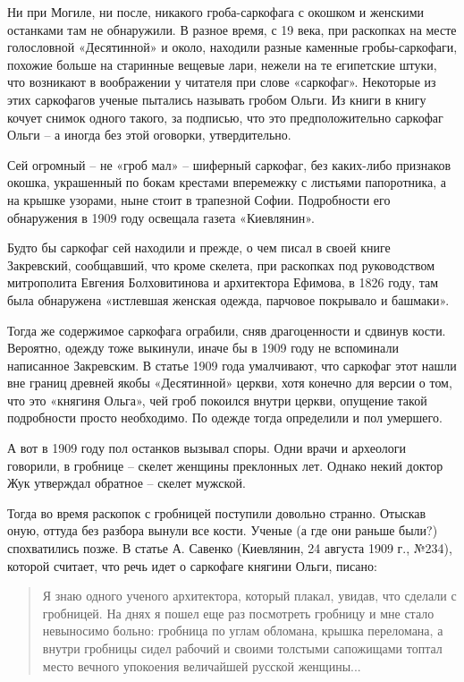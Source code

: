 Ни при Могиле, ни после, никакого гроба-саркофага с окошком и женскими останками там не обнаружили. В разное время, с 19 века, при раскопках на месте голословной «Десятинной» и около, находили разные каменные гробы-саркофаги, похожие больше на старинные вещевые лари, нежели на те египетские штуки, что возникают в воображении у читателя при слове «саркофаг». Некоторые из этих саркофагов ученые пытались называть гробом Ольги. Из книги в книгу кочует снимок одного такого, за подписью, что это предположительно саркофаг Ольги – а иногда без этой оговорки, утвердительно.

Сей огромный – не «гроб мал» – шиферный саркофаг, без каких-либо признаков окошка, украшенный по бокам крестами вперемежку с листьями папоротника, а на крышке узорами, ныне стоит в трапезной Софии. Подробности его обнаружения в 1909 году освещала газета «Киевлянин».

Будто бы саркофаг сей находили и прежде, о чем писал в своей книге Закревский, сообщавший, что кроме скелета, при раскопках под руководством митрополита Евгения Болховитинова и архитектора Ефимова, в 1826 году, там была обнаружена «истлевшая женская одежда, парчовое покрывало и башмаки». 

Тогда же содержимое саркофага ограбили, сняв драгоценности и сдвинув кости. Вероятно, одежду тоже выкинули, иначе бы в 1909 году не вспоминали написанное Закревским. В статье 1909 года умалчивают, что саркофаг этот нашли вне границ древней якобы «Десятинной» церкви, хотя конечно для версии о том, что это «княгиня Ольга», чей гроб покоился внутри церкви, опущение такой подробности просто необходимо. По одежде тогда определили и пол умершего. 

А вот в 1909 году пол останков вызывал споры. Одни врачи и археологи говорили, в гробнице – скелет женщины преклонных лет. Однако некий доктор Жук утверждал обратное – скелет мужской.

Тогда во время раскопок с гробницей поступили довольно странно. Отыскав оную, оттуда без разбора вынули все кости. Ученые (а где они раньше были?) спохватились позже. В статье А. Савенко (Киевлянин, 24 августа 1909 г., №234), которой считает, что речь идет о саркофаге княгини Ольги, писано: 

\begin{quotation}
Я знаю одного ученого архитектора, который плакал, увидав, что сделали с гробницей. На днях я пошел еще раз посмотреть гробницу и мне стало невыносимо больно: гробница по углам обломана, крышка переломана, а внутри гробницы сидел рабочий и своими толстыми сапожищами топтал место вечного упокоения величайшей русской женщины...
\end{quotation}

